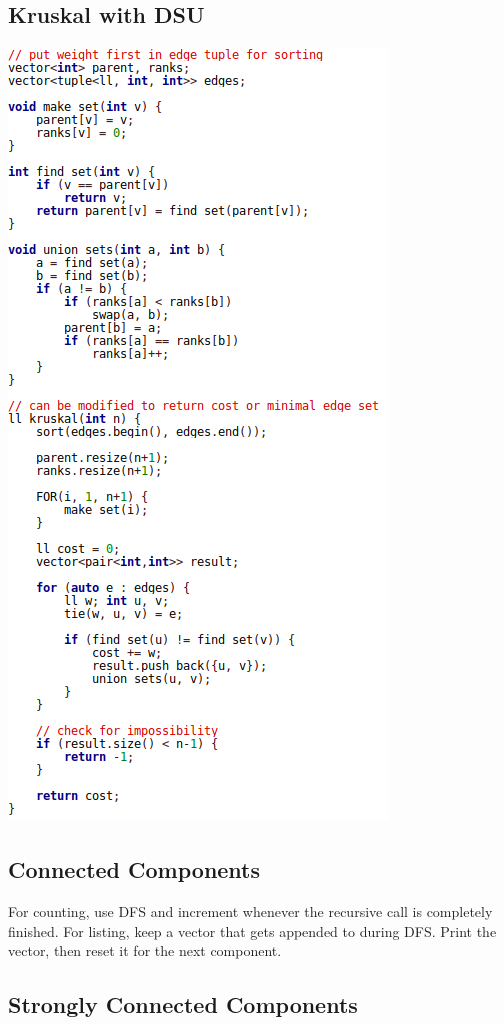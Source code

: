 \documentclass[11pt,twocolumn]{article}
\begin{document}
\subsection{Kruskal with DSU}
\includegraphics[scale=0.5]{kruskal}

\subsection{Connected Components}
For counting, use DFS and increment whenever the recursive call is completely finished. For listing, keep a vector that gets appended to during DFS. Print the vector, then reset it for the next component.

\subsection{Strongly Connected Components}
\end{document}

